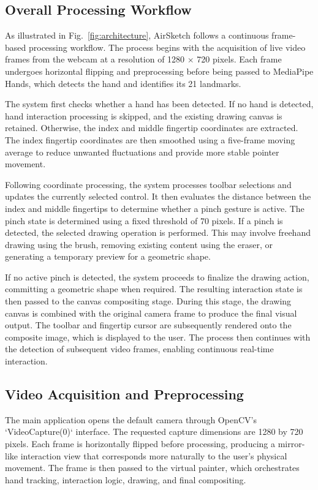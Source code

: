 \documentclass[conference]{IEEEtran}
\begin{document}
\subsection{Overall Processing Workflow}

As illustrated in Fig.~\ref{fig:architecture}, AirSketch follows a continuous frame-based processing workflow. The process begins with the acquisition of live video frames from the webcam at a resolution of 1280 $\times$ 720 pixels. Each frame undergoes horizontal flipping and preprocessing before being passed to MediaPipe Hands, which detects the hand and identifies its 21 landmarks.

The system first checks whether a hand has been detected. If no hand is detected, hand interaction processing is skipped, and the existing drawing canvas is retained. Otherwise, the index and middle fingertip coordinates are extracted. The index fingertip coordinates are then smoothed using a five-frame moving average to reduce unwanted fluctuations and provide more stable pointer movement.

Following coordinate processing, the system processes toolbar selections and updates the currently selected control. It then evaluates the distance between the index and middle fingertips to determine whether a pinch gesture is active. The pinch state is determined using a fixed threshold of 70 pixels. If a pinch is detected, the selected drawing operation is performed. This may involve freehand drawing using the brush, removing existing content using the eraser, or generating a temporary preview for a geometric shape.

If no active pinch is detected, the system proceeds to finalize the drawing action, committing a geometric shape when required. The resulting interaction state is then passed to the canvas compositing stage. During this stage, the drawing canvas is combined with the original camera frame to produce the final visual output. The toolbar and fingertip cursor are subsequently rendered onto the composite image, which is displayed to the user. The process then continues with the detection of subsequent video frames, enabling continuous real-time interaction.

\subsection{Video Acquisition and Preprocessing}
The main application opens the default camera through OpenCV's `VideoCapture(0)` interface. The requested capture dimensions are 1280 by 720 pixels. Each frame is horizontally flipped before processing, producing a mirror-like interaction view that corresponds more naturally to the user's physical movement. The frame is then passed to the virtual painter, which orchestrates hand tracking, interaction logic, drawing, and final compositing.
\end{document}
